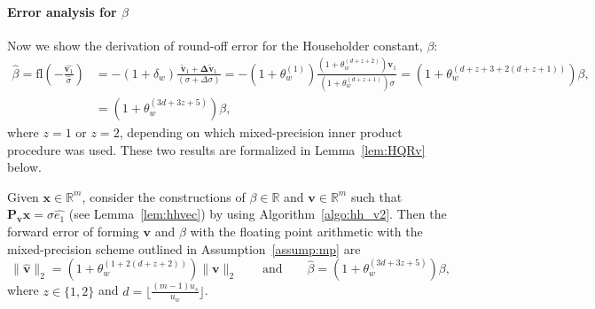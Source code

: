 \documentclass[review,onefignum,onetabnum]{siamart190516}
\newcommand{\R}{\mathbb{R}}
\newcommand{\dd}{\delta}
\newcommand{\tth}{\theta}
\newcommand{\bb}[1]{\mathbf{#1}}
\newcommand{\fl}{\mathrm{fl}}
\begin{document}
\paragraph{Error analysis for $\beta$}
Now we show the derivation of round-off error for the Householder constant, $\beta$:
\begin{align*}
\hat{\beta} = \fl\left(-\frac{\hat{\bb{v}_1}}{\hat{\sigma}}\right) &=-(1+\dd_w)\frac{\bb{\tilde{v}}_1+\bb{\Delta \tilde{v}}_1}{(\sigma + \Delta\sigma)} %
= -(1+\tth_w^{(1)})\frac{ (1+\tth_w^{(d+z+2)})\bb{v}_1}{(1+\tth_w^{(d+z+1)})\sigma} %
= (1+\tth_w^{(d+z+3+2(d+z+1))})\beta,\\
&= (1+\tth_w^{(3d+3z+5)})\beta,
\end{align*}
where $z=1$ or $z=2$, depending on which mixed-precision inner product procedure was used. 
These two results are formalized in Lemma~\ref{lem:HQRv} below.
\begin{lemma}
	\label{lem:HQRv}
	Given $\bb{x}\in\R^{m}$, consider the constructions of $\beta\in\R$ and $\bb{v}\in\R^{m}$ such that $\bb{P}_{\bb{v}}\bb{x}=\sigma\hat{e_1}$ (see Lemma~\ref{lem:hhvec}) by using Algorithm~\ref{algo:hh_v2}.
	Then the forward error of forming $\bb{v}$ and $\beta$ with the floating point arithmetic with the
	mixed-precision scheme outlined in Assumption~\ref{assump:mp} are
	\begin{equation*}
	\|\hat{\bb{v}}\|_2 = (1+\theta_w^{(1+2(d+z+2))})\|\bb{v}\|_2 \qquad \mbox{and} \qquad
	\hat{\beta} = (1+\tth_w^{(3d+3z+5)})\beta,
	\end{equation*}
	where $z\in\{1,2\}$ and $d=\lfloor\frac{(m-1)u_s}{u_w}\rfloor$.
\end{lemma}
%
\end{document}
